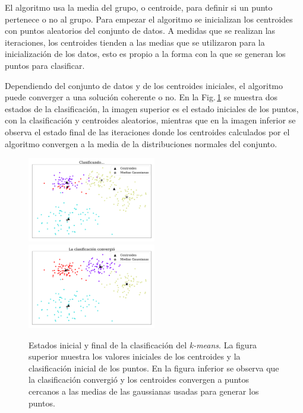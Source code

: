     El algoritmo usa la media del grupo, o centroide, para definir si un punto pertenece o no al grupo. Para empezar el algoritmo se inicializan los centroides con puntos aleatorios del conjunto de datos.  A medidas que se realizan las iteraciones, los centroides tienden a las medias que se utilizaron para la inicialización de los datos, esto es propio a la forma con la que se generan los puntos para clasificar.

    Dependiendo del conjunto de datos y de los centroides iniciales, el algoritmo puede converger a una solución coherente o no. En  la Fig.\,\ref{fig:ejer2_converge} se muestra dos estados de la clasificación, la imagen superior es el estado iniciales de los puntos, con la clasificación y centroides aleatorios, mientras que en la imagen inferior se observa el estado final de las iteraciones donde los centroides calculados por el algoritmo convergen a la media de la distribuciones normales del conjunto.

    \begin{figure}[H]
        \centering
        \includegraphics[width=0.5\textwidth]{plots/ejer_2_clasificando_a_conv.pdf}
        \includegraphics[width=0.5\textwidth]{plots/ejer_2_si_converge.pdf}
        \caption{Estados inicial y final de la clasificación  del \emph{k-means}. La figura superior muestra los valores iniciales de los centroides y la clasificación inicial de los puntos. En la figura inferior se observa que la clasificación convergió y los centroides convergen a puntos cercanos a las medias de las gaussianas  usadas para generar los puntos.}
        \label{fig:ejer2_converge}
    \end{figure}

